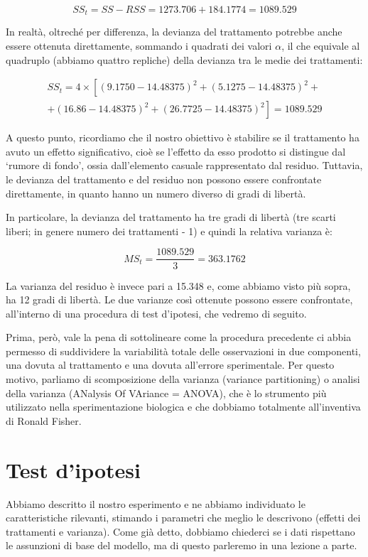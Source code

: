 \documentclass[a4paper,12pt,oneside]{book}
\begin{document}
\[SS_t = SS - RSS = 1273.706 + 184.1774 = 1089.529\]

In realtà, oltreché per differenza, la devianza del trattamento potrebbe anche essere ottenuta direttamente, sommando i quadrati dei valori \(\alpha\), il che equivale al quadruplo (abbiamo quattro repliche) della devianza tra le medie dei trattamenti:

\[{\begin{array}{l}
SS_t = 4 \times \left[ \left(9.1750 - 14.48375\right)^2 
+ \left(5.1275 - 14.48375\right)^2 + \right. \\
+ \left. \left(16.86 - 14.48375\right)^2 + \left(26.7725 - 14.48375\right)^2 \right] = 1089.529
\end{array}}\]

A questo punto, ricordiamo che il nostro obiettivo è stabilire se il trattamento ha avuto un effetto significativo, cioè se l'effetto da esso prodotto si distingue dal `rumore di fondo', ossia dall'elemento casuale rappresentato dal residuo. Tuttavia, le devianza del trattamento e del residuo non possono essere confrontate direttamente, in quanto hanno un numero diverso di gradi di libertà.

In particolare, la devianza del trattamento ha tre gradi di libertà (tre scarti liberi; in genere numero dei trattamenti - 1) e quindi la relativa varianza è:

\[MS_t = \frac{1089.529}{3} = 363.1762\]

La varianza del residuo è invece pari a 15.348 e, come abbiamo visto più sopra, ha 12 gradi di libertà. Le due varianze così ottenute possono essere confrontate, all'interno di una procedura di test d'ipotesi, che vedremo di seguito.

Prima, però, vale la pena di sottolineare come la procedura precedente ci abbia permesso di suddividere la variabilità totale delle osservazioni in due componenti, una dovuta al trattamento e una dovuta all'errore sperimentale. Per questo motivo, parliamo di scomposizione della varianza (variance partitioning) o analisi della varianza (ANalysis Of VAriance = ANOVA), che è lo strumento più utilizzato nella sperimentazione biologica e che dobbiamo totalmente all'inventiva di Ronald Fisher.

\hypertarget{test-dipotesi}{%
\section{Test d'ipotesi}\label{test-dipotesi}}

Abbiamo descritto il nostro esperimento e ne abbiamo individuato le caratteristiche rilevanti, stimando i parametri che meglio le descrivono (effetti dei trattamenti e varianza). Come già detto, dobbiamo chiederci se i dati rispettano le assunzioni di base del modello, ma di questo parleremo in una lezione a parte.
\end{document}
